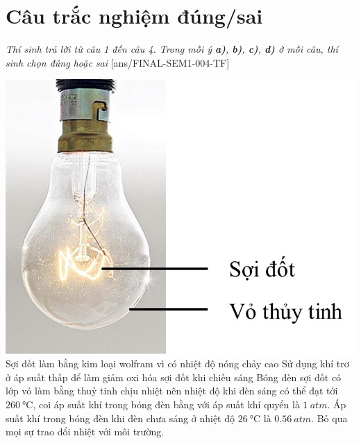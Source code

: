 \section{Câu trắc nghiệm đúng/sai} 
\textit{Thí sinh trả lời từ câu 1 đến câu 4. Trong mỗi ý \textbf{a)}, \textbf{b)}, \textbf{c)}, \textbf{d)} ở mỗi câu, thí sinh chọn đúng hoặc sai}
\setcounter{ex}{0}
[ans/FINAL-SEM1-004-TF]
\begin{ex}
	{\includegraphics[scale=0.3]{../figs/FINAL-SEM1-004-6}}
	{\True Sợi đốt làm bằng kim loại wolfram vì có nhiệt độ nóng chảy cao}
	{\True Sử dụng khí trơ ở áp suất thấp để làm giảm oxi hóa sợi đốt khi chiếu sáng}
	{\True Bóng đèn sợi đốt có lớp vỏ làm bằng thuỷ tinh chịu nhiệt nên nhiệt độ khi đèn sáng có thể đạt tới $\SI{260}{\celsius}$, coi áp suất khí trong bóng đèn bằng với áp suất khí quyển là $\SI{1}{atm}$. Áp suất khí trong bóng đèn khi đèn chưa sáng ở nhiệt độ $\SI{26}{\celsius}$ là $\SI{0.56}{atm}$. Bỏ qua mọi sự trao đổi nhiệt với môi trường.}
	\loigiai{}
\end{ex}
